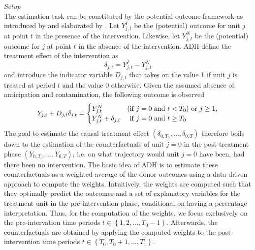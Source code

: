 \textit{Setup} \\
The estimation task can be constituted by the potential outcome framework as introduced by \cite{neyman:1923} and elaborated by \cite{rubin:1974}. Let $Y^{I}_{j,t}$ be the (potential) outcome for unit $j$ at point $t$ in the presence of the intervention. Likewise, let $Y^{N}_{j,t}$ be the (potential) outcome for $j$ at point $t$ in the absence of the intervention. \ac{ADH} define the treatment effect of the intervention as 
\[
\delta_{j,t} = Y^{I}_{j,t} - Y^{N}_{j,t}
\] 
and introduce the indicator variable $D_{j,t}$ that takes on the value 1 if unit $j$ is treated at period $t$ and the value 0 otherwise. Given the assumed absence of anticipation and contamination, the following outcome is observed
\[
Y_{j,t} + D_{j,t} \delta_{j,t} = 
\begin{cases}
	Y^{N}_{j,t} &\text{(if } j = 0 \text{ and } t < T_0\text{)} \text{ or } j \geq 1, \\
	Y^{N}_{j,t} + \delta_{j,t} &  \text{\phantom{(}if } j = 0 \text{ and } t \geq T_0
\end{cases}
\] 
The goal to estimate the causal treatment effect $(\delta_{0,T_0}, ..., \delta_{0,T})$ therefore boils down to the estimation of the counterfactuals of unit $j = 0$ in the post-treatment phase $(Y_{0,T_0}, ..., Y_{0,T})$, i.e. on what trajectory would unit $j=0$ have been, had there been no intervention. The basic idea of \ac{ADH} is to estimate these counterfactuals as a weighted average of the donor outcomes using a data-driven approach to compute the weights. Intuitively, the weights are computed such that they optimally predict the outcomes and a set of explanatory variables for the treatment unit in the pre-intervention phase, conditional on having a percentage interpretation. Thus, for the computation of the weights, we focus exclusively on the pre-intervation time periods $t \in \left\lbrace 1,2, ..., T_{0}-1\right\rbrace $. Afterwards, the counterfactuals are obtained by applying the computed weights to the post-intervention time periods $t \in \left\lbrace T_{0},T_{0}+1, ..., T_{1}\right\rbrace $.

